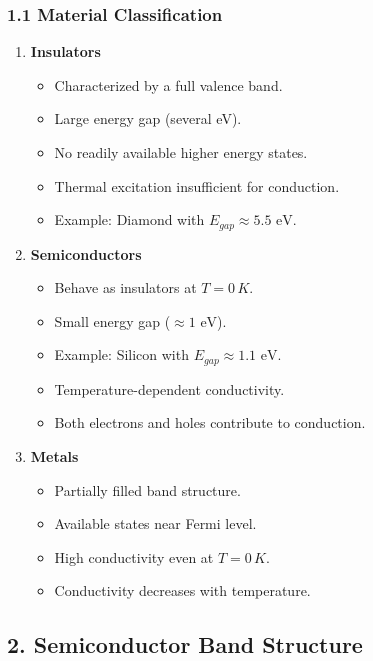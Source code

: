 \documentclass[12pt]{article}
\begin{document}
\subsubsection{1.1 Material Classification}
\begin{enumerate}
    \item \textbf{Insulators}
    \begin{itemize}
        \item Characterized by a full valence band.
        \item Large energy gap (several eV).
        \item No readily available higher energy states.
        \item Thermal excitation insufficient for conduction.
        \item Example: Diamond with \( E_{gap} \approx 5.5 \text{ eV} \).
    \end{itemize}
    
    \item \textbf{Semiconductors}
    \begin{itemize}
        \item Behave as insulators at \( T = 0\,K \).
        \item Small energy gap (\( \approx 1 \text{ eV} \)).
        \item Example: Silicon with \( E_{gap} \approx 1.1 \text{ eV} \).
        \item Temperature-dependent conductivity.
        \item Both electrons and holes contribute to conduction.
    \end{itemize}
    
    \item \textbf{Metals}
    \begin{itemize}
        \item Partially filled band structure.
        \item Available states near Fermi level.
        \item High conductivity even at \( T = 0\,K \).
        \item Conductivity decreases with temperature.
    \end{itemize}
\end{enumerate}

\subsection{2. Semiconductor Band Structure}
\end{document}
